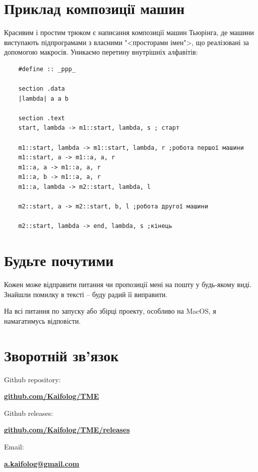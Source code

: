 \documentclass[oneside,final,14pt]{extreport}
\begin{document}
\section*{Приклад композиції машин}
Красивим і простим трюком є написання композиції машин Тьюрінга, де машини виступають підпрограмами з власними "<просторами імен">, що реалізовані за допомогою макросів. Уникаємо перетину внутрішніх алфавітів:
\begin{verbatim}
	#define :: _ppp_

	section .data
	|lambda| a a b

	section .text
	start, lambda -> m1::start, lambda, s ; старт

	m1::start, lambda -> m1::start, lambda, r ;робота першої машини
	m1::start, a -> m1::a, a, r
	m1::a, a -> m1::a, a, r
	m1::a, b -> m1::a, a, r
	m1::a, lambda -> m2::start, lambda, l

	m2::start, a -> m2::start, b, l ;робота другої машини
			
	m2::start, lambda -> end, lambda, s ;кінець
\end{verbatim}
\section*{Будьте почутими}

Кожен може відправити питання чи пропозиції мені на пошту у будь-якому виді. Знайшли помилку в тексті -- буду радий її виправити.

На всі питання по запуску або збірці проекту, особливо на MacOS, я намагатимусь відповісти.

\section*{Зворотній зв'язок}
Github repository:

{\bfseries \href{https://github.com/Kaifolog/TME}{github.com/Kaifolog/TME}}

Github releases:

{\bfseries \href{https://github.com/Kaifolog/TME/releases}{github.com/Kaifolog/TME/releases}}

Email:

{\bfseries \href{mailto:a.kaifolog@gmail.com}{a.kaifolog@gmail.com}}
\end{document}
